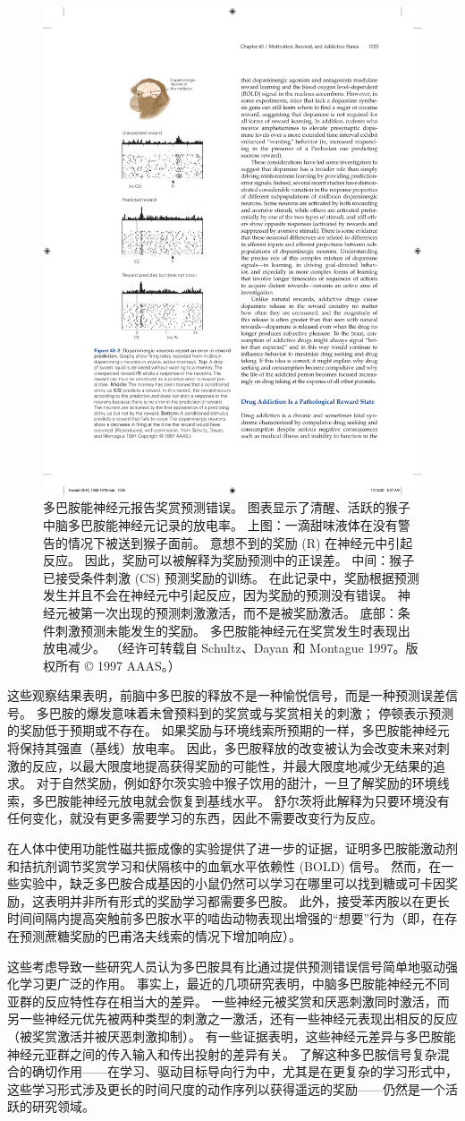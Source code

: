 \begin{figure}[htbp]
	\centering
	\includegraphics[width=0.4\linewidth]{chap43/fig_43_2}
	\caption{多巴胺能神经元报告奖赏预测错误。 图表显示了清醒、活跃的猴子中脑多巴胺能神经元记录的放电率。 上图：一滴甜味液体在没有警告的情况下被送到猴子面前。 意想不到的奖励 (R) 在神经元中引起反应。 因此，奖励可以被解释为奖励预测中的正误差。 中间：猴子已接受条件刺激 (CS) 预测奖励的训练。 在此记录中，奖励根据预测发生并且不会在神经元中引起反应，因为奖励的预测没有错误。 神经元被第一次出现的预测刺激激活，而不是被奖励激活。 底部：条件刺激预测未能发生的奖励。 多巴胺能神经元在奖赏发生时表现出放电减少。 （经许可转载自 Schultz、Dayan 和 Montague 1997。版权所有 © 1997 AAAS。）}
	\label{fig:43_2}
\end{figure}


这些观察结果表明，前脑中多巴胺的释放不是一种愉悦信号，而是一种预测误差信号。
多巴胺的爆发意味着未曾预料到的奖赏或与奖赏相关的刺激；
停顿表示预测的奖励低于预期或不存在。
如果奖励与环境线索所预期的一样，多巴胺能神经元将保持其强直（基线）放电率。
因此，多巴胺释放的改变被认为会改变未来对刺激的反应，以最大限度地提高获得奖励的可能性，并最大限度地减少无结果的追求。
对于自然奖励，例如舒尔茨实验中猴子饮用的甜汁，一旦了解奖励的环境线索，多巴胺能神经元放电就会恢复到基线水平。
舒尔茨将此解释为只要环境没有任何变化，就没有更多需要学习的东西，因此不需要改变行为反应。


在人体中使用功能性磁共振成像的实验提供了进一步的证据，证明多巴胺能激动剂和拮抗剂调节奖赏学习和伏隔核中的血氧水平依赖性 (BOLD) 信号。
然而，在一些实验中，缺乏多巴胺合成基因的小鼠仍然可以学习在哪里可以找到糖或可卡因奖励，这表明并非所有形式的奖励学习都需要多巴胺。
此外，接受苯丙胺以在更长时间间隔内提高突触前多巴胺水平的啮齿动物表现出增强的“想要”行为（即，在存在预测蔗糖奖励的巴甫洛夫线索的情况下增加响应）。


这些考虑导致一些研究人员认为多巴胺具有比通过提供预测错误信号简单地驱动强化学习更广泛的作用。
事实上，最近的几项研究表明，中脑多巴胺能神经元不同亚群的反应特性存在相当大的差异。
一些神经元被奖赏和厌恶刺激同时激活，而另一些神经元优先被两种类型的刺激之一激活，还有一些神经元表现出相反的反应（被奖赏激活并被厌恶刺激抑制）。
有一些证据表明，这些神经元差异与多巴胺能神经元亚群之间的传入输入和传出投射的差异有关。
了解这种多巴胺信号复杂混合的确切作用——在学习、驱动目标导向行为中，尤其是在更复杂的学习形式中，这些学习形式涉及更长的时间尺度的动作序列以获得遥远的奖励——仍然是一个活跃的研究领域。


